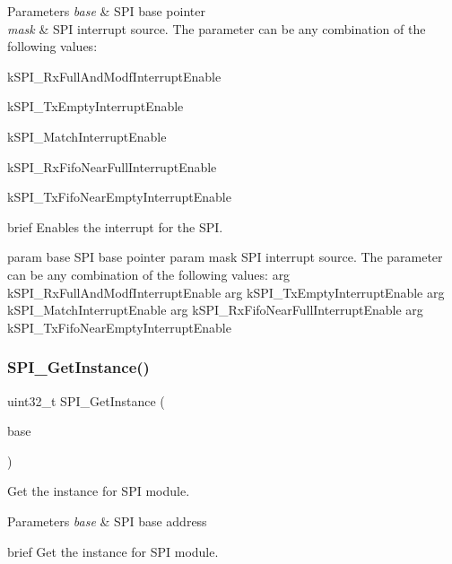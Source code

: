 \begin{DoxyParams}{Parameters}
{\em base} & S\+PI base pointer \\
\hline
{\em mask} & S\+PI interrupt source. The parameter can be any combination of the following values\+: \begin{DoxyItemize}
\item k\+S\+P\+I\+\_\+\+Rx\+Full\+And\+Modf\+Interrupt\+Enable \item k\+S\+P\+I\+\_\+\+Tx\+Empty\+Interrupt\+Enable \item k\+S\+P\+I\+\_\+\+Match\+Interrupt\+Enable \item k\+S\+P\+I\+\_\+\+Rx\+Fifo\+Near\+Full\+Interrupt\+Enable \item k\+S\+P\+I\+\_\+\+Tx\+Fifo\+Near\+Empty\+Interrupt\+Enable\end{DoxyItemize}
brief Enables the interrupt for the S\+PI.\\
\hline
\end{DoxyParams}
param base S\+PI base pointer param mask S\+PI interrupt source. The parameter can be any combination of the following values\+: arg k\+S\+P\+I\+\_\+\+Rx\+Full\+And\+Modf\+Interrupt\+Enable arg k\+S\+P\+I\+\_\+\+Tx\+Empty\+Interrupt\+Enable arg k\+S\+P\+I\+\_\+\+Match\+Interrupt\+Enable arg k\+S\+P\+I\+\_\+\+Rx\+Fifo\+Near\+Full\+Interrupt\+Enable arg k\+S\+P\+I\+\_\+\+Tx\+Fifo\+Near\+Empty\+Interrupt\+Enable \mbox{\label{group__spi__driver_gad823d00c394f6ca35c391dc178a25334}} 
\subsubsection{\texorpdfstring{SPI\_GetInstance()}{SPI\_GetInstance()}}
{\footnotesize\ttfamily uint32\+\_\+t S\+P\+I\+\_\+\+Get\+Instance (\begin{DoxyParamCaption}\item[{\mbox{\hyperlink{struct_s_p_i___type}{S\+P\+I\+\_\+\+Type}} $\ast$}]{base }\end{DoxyParamCaption})}



Get the instance for S\+PI module. 


\begin{DoxyParams}{Parameters}
{\em base} & S\+PI base address\\
\hline
\end{DoxyParams}
brief Get the instance for S\+PI module.

